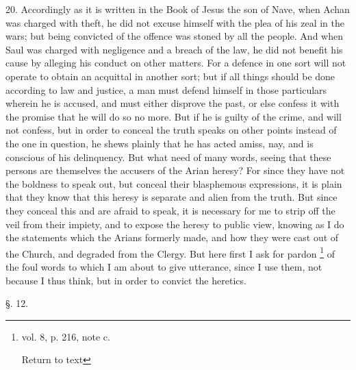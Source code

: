 20. Accordingly as it is written in the Book of
Jesus the son of Nave, when Achan was charged with theft, he did not
excuse himself with the plea of his zeal in the wars; but being
convicted of the offence was stoned by all the people. And when Saul
was charged with negligence and a breach of the law, he did not
benefit his cause by alleging his conduct on other matters. For a
defence in one sort will not operate to obtain an acquittal in another
sort; but if all things should be done according to law and justice, a
man must defend himself in those particulars wherein he is accused,
and must either disprove the past, or else confess it with the promise
that he will do so no more. But if he is guilty of the crime, and will
not confess, but in order to conceal the truth speaks on other points
instead of the one in question, he shews plainly that he has acted
amiss, nay, and is conscious of his delinquency. But what need of many
words, seeing that these persons are themselves the accusers of the
Arian heresy? For since they have not the boldness to speak out, but
conceal their blasphemous expressions, it is plain that they know that
this heresy is separate and alien from the truth. But since they
conceal this and are afraid to speak, it is necessary for me to strip
off the veil from their impiety, and to expose the heresy to
public view, knowing as I do the statements which the Arians formerly
made, and how they were cast out of the Church, and degraded from the
Clergy. But here first I ask for pardon \footnote{vol. 8, p. 216, note c.

Return to text} of the foul words to which I am about to give utterance, since
I use them, not because I thus think, but in order to convict the
heretics.


§. 12.

